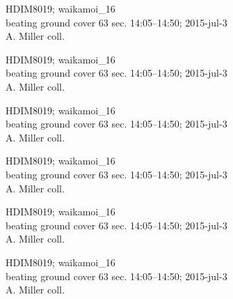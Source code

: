 \documentclass[2pt]{extarticle}
\begin{document}
\noindent
\parbox{0.16\textwidth}{\tiny \raggedright \rule[-0.3\baselineskip]{0pt}{10pt}HDIM8019; waikamoi\_16\\ beating ground cover 63 sec. 14:05--14:50; 2015-jul-3\\ A. Miller coll.}
\parbox{0.16\textwidth}{\tiny \raggedright \rule[-0.3\baselineskip]{0pt}{10pt}HDIM8019; waikamoi\_16\\ beating ground cover 63 sec. 14:05--14:50; 2015-jul-3\\ A. Miller coll.}
\parbox{0.16\textwidth}{\tiny \raggedright \rule[-0.3\baselineskip]{0pt}{10pt}HDIM8019; waikamoi\_16\\ beating ground cover 63 sec. 14:05--14:50; 2015-jul-3\\ A. Miller coll.}
\parbox{0.16\textwidth}{\tiny \raggedright \rule[-0.3\baselineskip]{0pt}{10pt}HDIM8019; waikamoi\_16\\ beating ground cover 63 sec. 14:05--14:50; 2015-jul-3\\ A. Miller coll.}
\parbox{0.16\textwidth}{\tiny \raggedright \rule[-0.3\baselineskip]{0pt}{10pt}HDIM8019; waikamoi\_16\\ beating ground cover 63 sec. 14:05--14:50; 2015-jul-3\\ A. Miller coll.}
\parbox{0.16\textwidth}{\tiny \raggedright \rule[-0.3\baselineskip]{0pt}{10pt}HDIM8019; waikamoi\_16\\ beating ground cover 63 sec. 14:05--14:50; 2015-jul-3\\ A. Miller coll.} \\ 
\vspace{0.001in} 
\end{document}
